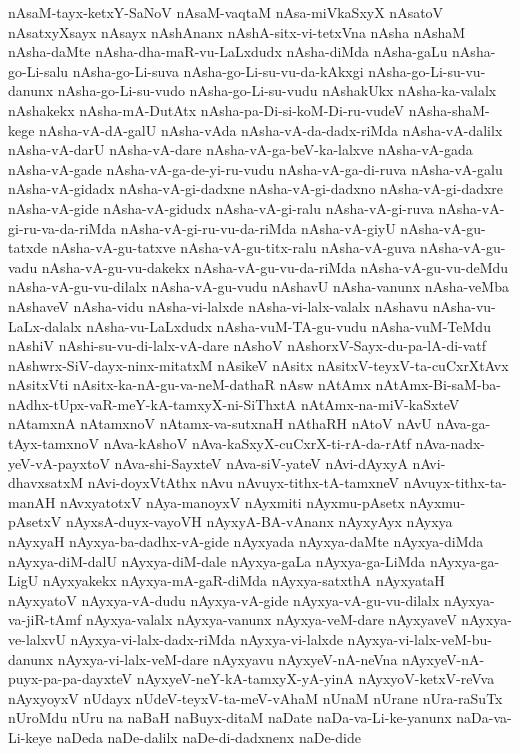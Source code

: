 {nAsaM-tayx-ketxY-SaNoV
nAsaM-vaqtaM
nAsa-miVkaSxyX
nAsatoV
nAsatxyXsayx
nAsayx
nAshAnanx
nAshA-sitx-vi-tetxVna
nAsha
nAshaM
nAsha-daMte
nAsha-dha-maR-vu-LaLxdudx
nAsha-diMda
nAsha-gaLu
nAsha-go-Li-salu
nAsha-go-Li-suva
nAsha-go-Li-su-vu-da-kAkxgi
nAsha-go-Li-su-vu-danunx
nAsha-go-Li-su-vudo
nAsha-go-Li-su-vudu
nAshakUkx
nAsha-ka-valalx
nAshakekx
nAsha-mA-DutAtx
nAsha-pa-Di-si-koM-Di-ru-vudeV
nAsha-shaM-kege
nAsha-vA-dA-galU
nAsha-vAda
nAsha-vA-da-dadx-riMda
nAsha-vA-dalilx
nAsha-vA-darU
nAsha-vA-dare
nAsha-vA-ga-beV-ka-lalxve
nAsha-vA-gada
nAsha-vA-gade
nAsha-vA-ga-de-yi-ru-vudu
nAsha-vA-ga-di-ruva
nAsha-vA-galu
nAsha-vA-gidadx
nAsha-vA-gi-dadxne
nAsha-vA-gi-dadxno
nAsha-vA-gi-dadxre
nAsha-vA-gide
nAsha-vA-gidudx
nAsha-vA-gi-ralu
nAsha-vA-gi-ruva
nAsha-vA-gi-ru-va-da-riMda
nAsha-vA-gi-ru-vu-da-riMda
nAsha-vA-giyU
nAsha-vA-gu-tatxde
nAsha-vA-gu-tatxve
nAsha-vA-gu-titx-ralu
nAsha-vA-guva
nAsha-vA-gu-vadu
nAsha-vA-gu-vu-dakekx
nAsha-vA-gu-vu-da-riMda
nAsha-vA-gu-vu-deMdu
nAsha-vA-gu-vu-dilalx
nAsha-vA-gu-vudu
nAshavU
nAsha-vanunx
nAsha-veMba
nAshaveV
nAsha-vidu
nAsha-vi-lalxde
nAsha-vi-lalx-valalx
nAshavu
nAsha-vu-LaLx-dalalx
nAsha-vu-LaLxdudx
nAsha-vuM-TA-gu-vudu
nAsha-vuM-TeMdu
nAshiV
nAshi-su-vu-di-lalx-vA-dare
nAshoV
nAshorxV-Sayx-du-pa-lA-di-vatf
nAshwrx-SiV-dayx-ninx-mitatxM
nAsikeV
nAsitx
nAsitxV-teyxV-ta-cuCxrXtAvx
nAsitxVti
nAsitx-ka-nA-gu-va-neM-dathaR
nAsw
nAtAmx
nAtAmx-Bi-saM-ba-nAdhx-tUpx-vaR-meY-kA-tamxyX-ni-SiThxtA
nAtAmx-na-miV-kaSxteV
nAtamxnA
nAtamxnoV
nAtamx-va-sutxnaH
nAthaRH
nAtoV
nAvU
nAva-ga-tAyx-tamxnoV
nAva-kAshoV
nAva-kaSxyX-cuCxrX-ti-rA-da-rAtf
nAva-nadx-yeV-vA-payxtoV
nAva-shi-SayxteV
nAva-siV-yateV
nAvi-dAyxyA
nAvi-dhavxsatxM
nAvi-doyxVtAthx
nAvu
nAvuyx-tithx-tA-tamxneV
nAvuyx-tithx-ta-manAH
nAvxyatotxV
nAya-manoyxV
nAyxmiti
nAyxmu-pAsetx
nAyxmu-pAsetxV
nAyxsA-duyx-vayoVH
nAyxyA-BA-vAnanx
nAyxyAyx
nAyxya
nAyxyaH
nAyxya-ba-dadhx-vA-gide
nAyxyada
nAyxya-daMte
nAyxya-diMda
nAyxya-diM-dalU
nAyxya-diM-dale
nAyxya-gaLa
nAyxya-ga-LiMda
nAyxya-ga-LigU
nAyxyakekx
nAyxya-mA-gaR-diMda
nAyxya-satxthA
nAyxyataH
nAyxyatoV
nAyxya-vA-dudu
nAyxya-vA-gide
nAyxya-vA-gu-vu-dilalx
nAyxya-va-jiR-tAmf
nAyxya-valalx
nAyxya-vanunx
nAyxya-veM-dare
nAyxyaveV
nAyxya-ve-lalxvU
nAyxya-vi-lalx-dadx-riMda
nAyxya-vi-lalxde
nAyxya-vi-lalx-veM-bu-danunx
nAyxya-vi-lalx-veM-dare
nAyxyavu
nAyxyeV-nA-neVna
nAyxyeV-nA-puyx-pa-pa-dayxteV
nAyxyeV-neY-kA-tamxyX-yA-yinA
nAyxyoV-ketxV-reVva
nAyxyoyxV
nUdayx
nUdeV-teyxV-ta-meV-vAhaM
nUnaM
nUrane
nUra-raSuTx
nUroMdu
nUru
na
naBaH
naBuyx-ditaM
naDate
naDa-va-Li-ke-yanunx
naDa-va-Li-keye
naDeda
naDe-dalilx
naDe-di-dadxnenx
naDe-dide
}
